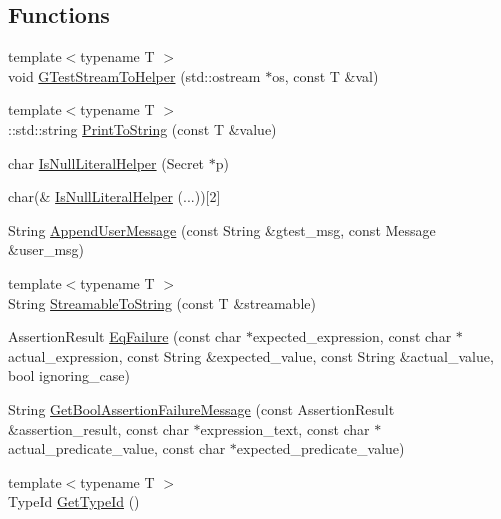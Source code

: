 \subsection*{\-Functions}
\begin{DoxyCompactItemize}
\item 
{\footnotesize template$<$typename T $>$ }\\void \hyperlink{gtest-internal_8h_af0fbea15c77edca96f48afb7c0e1c2b7}{\-G\-Test\-Stream\-To\-Helper} (std\-::ostream $\ast$os, const \-T \&val)
\item 
{\footnotesize template$<$typename T $>$ }\\\-::std\-::string \hyperlink{namespacetesting_a44c473dd1caaed17b53a19dff4e4f7ef}{\-Print\-To\-String} (const \-T \&value)
\item 
char \hyperlink{namespacetesting_1_1internal_a22c4be07d56f4f76ad08b35bfd40a685}{\-Is\-Null\-Literal\-Helper} (\-Secret $\ast$p)
\item 
char(\& \hyperlink{namespacetesting_1_1internal_ab06a7bb0f775834a238d9ad7e8152813}{\-Is\-Null\-Literal\-Helper} (...))\mbox{[}2\mbox{]}
\item 
\-String \hyperlink{namespacetesting_1_1internal_a92cc3c0f16012ce7143a5c3256c00a29}{\-Append\-User\-Message} (const \-String \&gtest\-\_\-msg, const \-Message \&user\-\_\-msg)
\item 
{\footnotesize template$<$typename T $>$ }\\\-String \hyperlink{namespacetesting_1_1internal_a66c1c8bcb19e8562b79bd8ef9bab2aa9}{\-Streamable\-To\-String} (const \-T \&streamable)
\item 
\-Assertion\-Result \hyperlink{namespacetesting_1_1internal_a1b32471fa3a4994b5e41120a349162ca}{\-Eq\-Failure} (const char $\ast$expected\-\_\-expression, const char $\ast$actual\-\_\-expression, const \-String \&expected\-\_\-value, const \-String \&actual\-\_\-value, bool ignoring\-\_\-case)
\item 
\-String \hyperlink{namespacetesting_1_1internal_ab5e2ffddf04d86a4faa0253b8e1fe67e}{\-Get\-Bool\-Assertion\-Failure\-Message} (const \-Assertion\-Result \&assertion\-\_\-result, const char $\ast$expression\-\_\-text, const char $\ast$actual\-\_\-predicate\-\_\-value, const char $\ast$expected\-\_\-predicate\-\_\-value)
\item 
{\footnotesize template$<$typename T $>$ }\\\-Type\-Id \hyperlink{namespacetesting_1_1internal_a355043c4b5e1fa83312afadc5c975c8f}{\-Get\-Type\-Id} ()
\item 

\end{DoxyCompactItemize}
